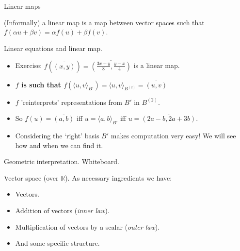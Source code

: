 \documentclass{beamer}
\begin{document}
\begin{frame}{Linear maps}
 
  (Informally) a linear map is a map between vector spaces such that $f(\alpha u + \beta v) = \alpha f(u) + \beta f(v)$.
  

  \begin{block}{Linear equations and linear map.}
    \begin{itemize}
    \item Exercise: $f( \overline{(x, y)} ) = \overline{(\frac{3x + y}{8}, \frac{y - x}{4} )}$ is a linear map.
    \item {\bf{$f$ is such that $f(\langle u, v \rangle_{B'}) = \langle u, v \rangle_{B^{(2)}} = \overline{(u, v)}$}}
    \item $f$ 'reinterprets' representations from $B'$ in $B^{(2)}$.
    \item So $f(u) = \overline{(a, b)}$ iff $u = \langle a, b \rangle_{B'}$ iff $u = \overline{(2a - b, 2a + 3b)}$.
    \item Considering the `right' basis $B'$ makes computation very easy! We will see how and when we can find it.
    \end{itemize} 
  \end{block}
  
\end{frame}

\begin{frame}{Geometric interpretation.}
  Whiteboard.
\end{frame}

\begin{frame}{Vector space (over $\mathbb{R}$).}
  As necessary ingredients we have:
  \begin{itemize}
  \item Vectors.
  \item Addition of vectors (\emph{inner law}).
  \item Multiplication of vectors by a scalar (\emph{outer law}).
  \item And some specific structure.
  \end{itemize}
\end{frame}
\end{document}
